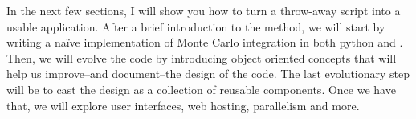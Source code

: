 In the next few sections, I will show you how to turn a throw-away script into a usable
application. After a brief introduction to the method, we will start by writing a na\"ive
implementation of Monte Carlo integration in both python and \cpp. Then, we will evolve the
code by introducing object oriented concepts that will help us improve--and document--the
design of the code. The last evolutionary step will be to cast the design as a collection of
reusable components. Once we have that, we will explore user interfaces, web hosting,
parallelism and more.

